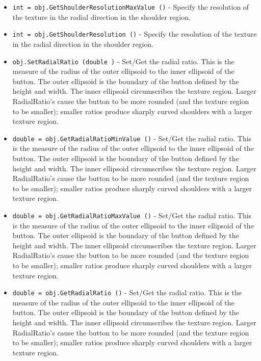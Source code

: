 \begin{itemize}
\item  \verb|int = obj.GetShoulderResolutionMaxValue ()| -  Specify the resolution of the texture in the radial direction in the
 shoulder region.

\item  \verb|int = obj.GetShoulderResolution ()| -  Specify the resolution of the texture in the radial direction in the
 shoulder region.

\item  \verb|obj.SetRadialRatio (double )| -  Set/Get the radial ratio. This is the measure of the radius of the
 outer ellipsoid to the inner ellipsoid of the button. The outer
 ellipsoid is the boundary of the button defined by the height and
 width. The inner ellipsoid circumscribes the texture region. Larger
 RadialRatio's cause the button to be more rounded (and the texture
 region to be smaller); smaller ratios produce sharply curved shoulders
 with a larger texture region.

\item  \verb|double = obj.GetRadialRatioMinValue ()| -  Set/Get the radial ratio. This is the measure of the radius of the
 outer ellipsoid to the inner ellipsoid of the button. The outer
 ellipsoid is the boundary of the button defined by the height and
 width. The inner ellipsoid circumscribes the texture region. Larger
 RadialRatio's cause the button to be more rounded (and the texture
 region to be smaller); smaller ratios produce sharply curved shoulders
 with a larger texture region.

\item  \verb|double = obj.GetRadialRatioMaxValue ()| -  Set/Get the radial ratio. This is the measure of the radius of the
 outer ellipsoid to the inner ellipsoid of the button. The outer
 ellipsoid is the boundary of the button defined by the height and
 width. The inner ellipsoid circumscribes the texture region. Larger
 RadialRatio's cause the button to be more rounded (and the texture
 region to be smaller); smaller ratios produce sharply curved shoulders
 with a larger texture region.

\item  \verb|double = obj.GetRadialRatio ()| -  Set/Get the radial ratio. This is the measure of the radius of the
 outer ellipsoid to the inner ellipsoid of the button. The outer
 ellipsoid is the boundary of the button defined by the height and
 width. The inner ellipsoid circumscribes the texture region. Larger
 RadialRatio's cause the button to be more rounded (and the texture
 region to be smaller); smaller ratios produce sharply curved shoulders
 with a larger texture region.

\end{itemize}
